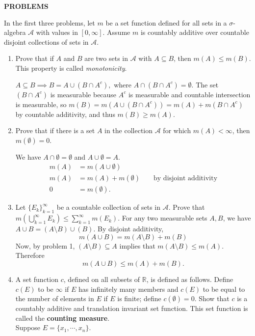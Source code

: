 \begin{center}
	\textbf{PROBLEMS}
\end{center}
In the first three problems, let $m$ be a set function defined for all sets in a $\sigma$-algebra $\mathcal{A}$ with values in $[0,\infty]$. Assume $m$ is countably additive over countable disjoint collections of sets in $\mathcal{A}$.
\begin{enumerate}
	\setcounter{enumi}{0}
	\item Prove that if $A$ and $B$ are two sets in $\mathcal{A}$ with $A \subseteq B$, then $m(A) \le m(B)$. This property is called \textit{monotonicity}.\par
	$A \subseteq B \implies B = A \cup (B \cap A^c),$ where $A \cap (B \cap A^c) = \emptyset$. The set $(B \cap A^c)$ is measurable because $A^c$ is measurable and countable intersection is measurable, so $m(B) = m(A \cup (B \cap A^c)) = 	m(A) + m(B \cap A^c)$ by countable additivity, and thus $m(B) \ge m(A)$.
	\item Prove that if there is a set $A$ in the collection $\mathcal{A}$ for which $m(A) < \infty$, then $m(\emptyset) = 0$.\par
	We have $A\cap\emptyset = \emptyset$ and $A\cup\emptyset = A$. 
    \begin{align*}
        m(A)&=m(A\cup\emptyset)\\
        m(A)&=m(A)+m(\emptyset)&&\text{ by disjoint additivity}\\
        0&=m(\emptyset).
    \end{align*}
	\item Let $\{E_k\}_{k=1}^\infty$ be a countable collection of sets in $\mathcal{A}$. Prove that $m(\bigcup_{k=1}^\infty E_k) \le \sum_{k=1}^\infty m(E_k).$
    For any two measurable sets $A,B$, we have $A\cup B=(A\setminus B)\cup(B)$.
    By disjoint additivity,
    \[
        m(A\cup B) = m(A\setminus B)+m(B)
    \]
    Now, by problem 1, $(A\setminus B)\subseteq A$ implies that $m(A\setminus B)\le m(A)$.
    Therefore
    \[
        m(A\cup B) \le m(A)+m(B).
    \]
    \item A set function $c$, defined on all subsets of $\mathbb{R}$, is defined as follows.
	Define $c(E)$ to be $\infty$ if $E$ has infinitely many members and $c(E)$ to be equal to the number of elements in $E$ if $E$ is finite; define $c(\emptyset)=0$. Show that $c$ is a countably additive and translation invariant set function. This set function is called the \textbf{counting measure}.\\
    Suppose $E=\{x_1,\cdots,x_n\}$.\\

\end{enumerate}
